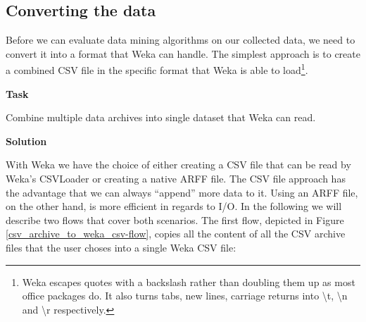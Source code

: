 \documentclass[a4paper,10pt]{book}
\newcommand{\heading}[1]{
  \vspace{0.3cm} \noindent \textbf{#1} \newline
}
\begin{document}
\subsection{Converting the data}
Before we can evaluate data mining algorithms on our collected data, we need to convert it into a format that Weka can handle. The simplest approach is to create a combined CSV file in the specific format that Weka is able to load\footnote{Weka escapes quotes with a backslash rather than doubling them up as most office packages do. It also turns tabs, new lines, carriage returns into \textbackslash t, \textbackslash n and \textbackslash r respectively.}.

\heading{Task}
Combine multiple data archives into single dataset that Weka can read.

\heading{Solution}
With Weka we have the choice of either creating a CSV file that can be read by Weka's CSVLoader or creating a native ARFF file. The CSV file approach has the advantage that we can always ``append'' more data to it. Using an ARFF file, on the other hand, is more efficient in regards to I/O. In the following we will describe two flows that cover both scenarios.
The first flow, depicted in Figure \ref{csv_archive_to_weka_csv-flow}, copies all the content of all the CSV archive files that the user choses into a single Weka CSV file:
\end{document}
